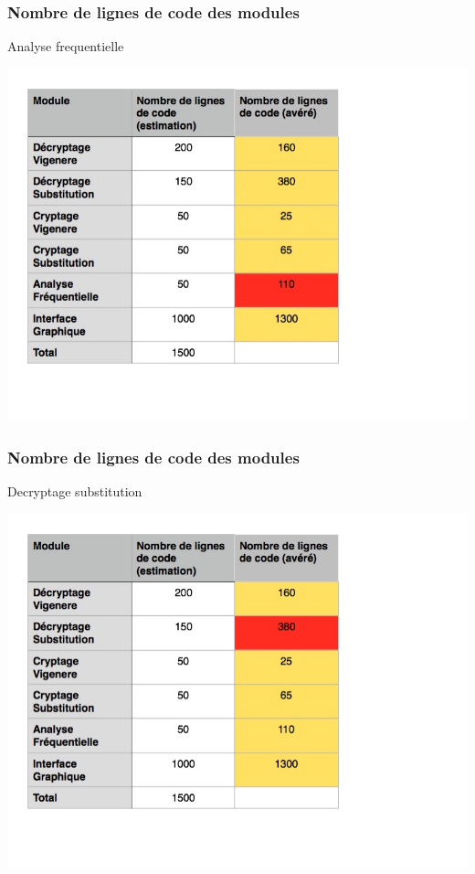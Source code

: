 \documentclass[10pt,xcolor=table]{beamer}
\begin{document}
\begin{frame}
\frametitle{Nombre de lignes de code des modules}
\begin{block}{Analyse frequentielle}
\begin{center}
\includegraphics[scale =0.3]{preview2.jpg} \\ 
\end{center}
\end{block}
\end{frame}

\begin{frame}
\frametitle{Nombre de lignes de code des modules}
\begin{block}{Decryptage substitution}
\begin{center}
\includegraphics[scale =0.3]{preview3.jpg} \\ 
\end{center}
\end{block}
\end{frame}
\end{document}
